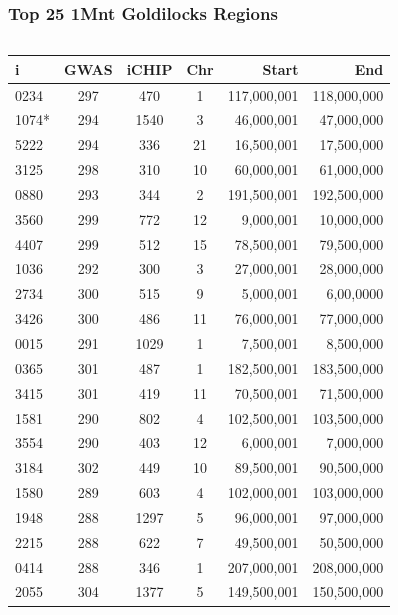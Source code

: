 \documentclass{beamer}
\begin{document}
\begin{frame}[t]
\frametitle{Top 25 1Mnt Goldilocks Regions}
    \begin{columns}[c]
    \column{7.5cm}
        \begin{table}[H]
            \tiny
            \centering
            \begin{tabular}{l | c  c  c  r  r}
                i & GWAS & iCHIP & Chr & Start & End \\
                \hline
                0234&297&470&1& 117,000,001 &  118,000,000\\
                1074*&294&1540&3&  46,000,001 &   47,000,000\\
                5222&294&336&21&  16,500,001 &   17,500,000\\
                3125&298&310&10&  60,000,001 &   61,000,000\\
                0880&293&344&2& 191,500,001 &  192,500,000\\
                3560&299&772&12&   9,000,001 &   10,000,000\\
                4407&299&512&15&  78,500,001 &   79,500,000\\
                1036&292&300&3&  27,000,001 &   28,000,000\\
                2734&300&515&9&   5,000,001&    6,00,0000\\
                3426&300&486&11&  76,000,001 &   77,000,000\\
                0015&291&1029&1&   7,500,001 &    8,500,000\\
                0365&301&487&1& 182,500,001 &  183,500,000\\
                3415&301&419&11&  70,500,001 &   71,500,000\\
                1581&290&802&4& 102,500,001 &  103,500,000\\
                3554&290&403&12&   6,000,001 &    7,000,000\\
                3184&302&449&10&  89,500,001 &   90,500,000\\
                1580&289&603&4& 102,000,001 &  103,000,000\\
                1948&288&1297&5&  96,000,001 &   97,000,000\\
                2215&288&622&7&  49,500,001 &   50,500,000\\
                0414&288&346&1& 207,000,001&  208,000,000\\
                2055&304&1377&5& 149,500,001 &  150,500,000\\

\end{tabular}
\end{table}
\end{columns}
\end{frame}
\end{document}
